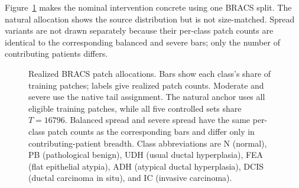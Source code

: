 \documentclass[11pt]{article}
\begin{document}
Figure~\ref{fig:bracs-realized-allocations} makes the nominal intervention concrete using one BRACS split. The natural allocation shows the source distribution but is not size-matched. Spread variants are not drawn separately because their per-class patch counts are identical to the corresponding balanced and severe bars; only the number of contributing patients differs.

\begin{figure}[ht]
  \centering
  \begingroup
  \newcommand{\allocationpanel}[7]{%
    \begin{scope}[shift={(#1,#2)}]
      \node[font=\small\bfseries, align=center] at (2.55,0.67) {#3};
      \node[font=\scriptsize, align=center] at (2.55,0.34) {$T=\num{#4}$, $\rho_{\mathrm{achieved}}=\num{#5}$};
      \foreach \tick in {0,20,40,60} {
        \draw[gray!25, thin] ({0.085*\tick},0.05) -- ({0.085*\tick},-3.18);
        \node[font=\scriptsize, anchor=north] at ({0.085*\tick},-3.22) {\tick\%};
      }
      \foreach \class/\share/\patches [count=\row from 0] in {#7} {
        \pgfmathsetmacro{\y}{-0.47*\row}
        \node[font=\scriptsize, anchor=east] at (-0.10,\y) {\class};
        \fill[#6] (0,\y-0.14) rectangle ({0.085*\share},\y+0.14);
        \node[font=\scriptsize, anchor=west] at ({0.085*\share+0.05},\y) {\num{\patches}};
      }
    \end{scope}%
  }
  \endgroup
  \caption{Realized BRACS patch allocations. Bars show each class's share of training patches; labels give realized patch counts. Moderate and severe use the native tail assignment. The natural anchor uses all eligible training patches, while all five controlled sets share $T=\num{16796}$. Balanced spread and severe spread have the same per-class patch counts as the corresponding bars and differ only in contributing-patient breadth. Class abbreviations are N (normal), PB (pathological benign), UDH (usual ductal hyperplasia), FEA (flat epithelial atypia), ADH (atypical ductal hyperplasia), DCIS (ductal carcinoma in situ), and IC (invasive carcinoma).}
  \label{fig:bracs-realized-allocations}
\end{figure}
\end{document}
